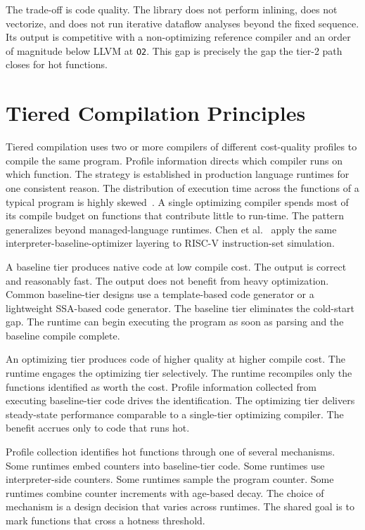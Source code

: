 The trade-off is code quality. The library does not perform inlining, does not vectorize, and does not run iterative dataflow analyses beyond the fixed sequence. Its output is competitive with a non-optimizing reference compiler and an order of magnitude below LLVM at \texttt{O2}. This gap is precisely the gap the tier-2 path closes for hot functions.

\section{Tiered Compilation Principles}
\label{sec:bg:tiered}

Tiered compilation uses two or more compilers of different cost-quality profiles to compile the same program. Profile information directs which compiler runs on which function. The strategy is established in production language runtimes for one consistent reason. The distribution of execution time across the functions of a typical program is highly skewed~\cite{knuth1971empirical}. A single optimizing compiler spends most of its compile budget on functions that contribute little to run-time. The pattern generalizes beyond managed-language runtimes. Chen et al.~\cite{chen2024riscv} apply the same interpreter-baseline-optimizer layering to RISC-V instruction-set simulation.

A baseline tier produces native code at low compile cost. The output is correct and reasonably fast. The output does not benefit from heavy optimization. Common baseline-tier designs use a template-based code generator or a lightweight SSA-based code generator. The baseline tier eliminates the cold-start gap. The runtime can begin executing the program as soon as parsing and the baseline compile complete.

An optimizing tier produces code of higher quality at higher compile cost. The runtime engages the optimizing tier selectively. The runtime recompiles only the functions identified as worth the cost. Profile information collected from executing baseline-tier code drives the identification. The optimizing tier delivers steady-state performance comparable to a single-tier optimizing compiler. The benefit accrues only to code that runs hot.

Profile collection identifies hot functions through one of several mechanisms. Some runtimes embed counters into baseline-tier code. Some runtimes use interpreter-side counters. Some runtimes sample the program counter. Some runtimes combine counter increments with age-based decay. The choice of mechanism is a design decision that varies across runtimes. The shared goal is to mark functions that cross a hotness threshold.

